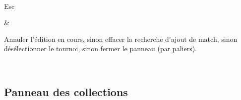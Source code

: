 \documentclass[letterpaper,10pt,greek]{sphinxmanual}
\begin{document}
\begin{savenotes}
\begin{tabular}[t]{}
\\
\sphinxhline\begin{varwidth}[t]{}
\sphinxAtStartPar
Esc
\sphinxbeforeendvarwidth
\end{varwidth}%
&\begin{varwidth}[t]{}
\sphinxAtStartPar
Annuler l’édition en cours, sinon effacer la recherche d’ajout de match, sinon désélectionner le tournoi, sinon fermer le panneau (par paliers).
\sphinxbeforeendvarwidth
\end{varwidth}%
\\
\sphinxbottomrule
\end{tabular}
\sphinxtableafterendhook\par
\sphinxattableend\end{savenotes}


\subsection{Panneau des collections}
\label{\detokenize{raccourcis:panneau-des-collections}}\label{\detokenize{raccourcis:raccourcis-collection-panel}}
\end{document}
